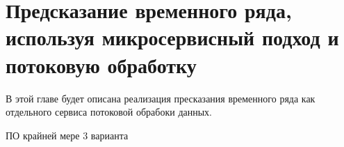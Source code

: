 \chapter{Предсказание временного ряда, используя микросервисный подход и потоковую обработку}
\begin{annotation}
  В этой главе будет описана реализация пресказания временного ряда как отдельного сервиса потоковой обрабоки данных. 
\end{annotation}

ПО крайней мере 3 варианта